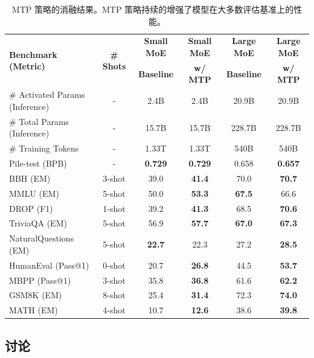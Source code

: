 \documentclass[lang=cn,a4paper,newtx]{elegantpaper}
\begin{document}
\begin{table}[h]
    \centering
    \footnotesize
    \setlength{\tabcolsep}{8pt}
    \begin{tabular}{@{}l c | c c | c c@{}}
    \toprule
    \multirow{2}{*}{\centering \textbf{Benchmark (Metric)}} & \multirow{2}{*}{\textbf{\# Shots}} & \textbf{Small MoE} & \textbf{Small MoE} & \textbf{Large MoE} & \textbf{Large MoE} \\
     & & \textbf{Baseline} & \textbf{w/ MTP} & \textbf{Baseline} & \textbf{w/ MTP} \\
    \midrule
    \# Activated Params {\tiny (Inference)} & - & 2.4B & 2.4B & 20.9B & 20.9B \\
    \# Total Params {\tiny (Inference)} & - & 15.7B & 15.7B & 228.7B & 228.7B \\
    \# Training Tokens & - & 1.33T & 1.33T & 540B & 540B \\
    \midrule
    Pile-test {\tiny (BPB)} & - & \textbf{0.729} & \textbf{0.729} & 0.658 & \textbf{0.657} \\
    BBH {\tiny (EM)} & 3-shot & 39.0 & \textbf{41.4} & 70.0 & \textbf{70.7} \\
    MMLU {\tiny (EM)} & 5-shot & 50.0 & \textbf{53.3} & \textbf{67.5} & 66.6 \\
    DROP {\tiny (F1)} & 1-shot & 39.2 & \textbf{41.3} & 68.5 & \textbf{70.6} \\
    TriviaQA {\tiny (EM)} & 5-shot & 56.9 & \textbf{57.7} & \textbf{67.0} & \textbf{67.3} \\
    NaturalQuestions {\tiny (EM)} & 5-shot & \textbf{22.7} & 22.3 & 27.2 & \textbf{28.5} \\
    HumanEval {\tiny (Pass@1)} & 0-shot & 20.7 & \textbf{26.8} & 44.5 & \textbf{53.7} \\
    MBPP {\tiny (Pass@1)} & 3-shot & 35.8 & \textbf{36.8} & 61.6 & \textbf{62.2} \\
    GSM8K {\tiny (EM)} & 8-shot & 25.4 & \textbf{31.4} & 72.3 & \textbf{74.0} \\
    MATH {\tiny (EM)} & 4-shot & 10.7 & \textbf{12.6} & 38.6 & \textbf{39.8} \\
    \bottomrule
    \end{tabular}
    \caption{MTP 策略的消融结果。MTP 策略持续的增强了模型在大多数评估基准上的性能。}
    \label{tab:ablation_nextn}
\end{table}

\subsection{讨论}
\end{document}
